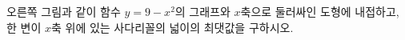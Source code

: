 \noindent\begin{minipage}[t]{0.58\linewidth}\vspace{0pt}\raggedright 오른쪽 그림과 같이 함수 $y=9-x^2$의 그래프와 $x$축으로 둘러싸인 도형에 내접하고, 한 변이 $x$축 위에 있는 사다리꼴의 넓이의 최댓값을 구하시오.\end{minipage}\hfill\begin{minipage}[t]{0.4\linewidth}\vspace{0pt}\centering \resizebox{\ifdim\width>\linewidth\linewidth\else\width\fi}{!}{}\end{minipage}\par

